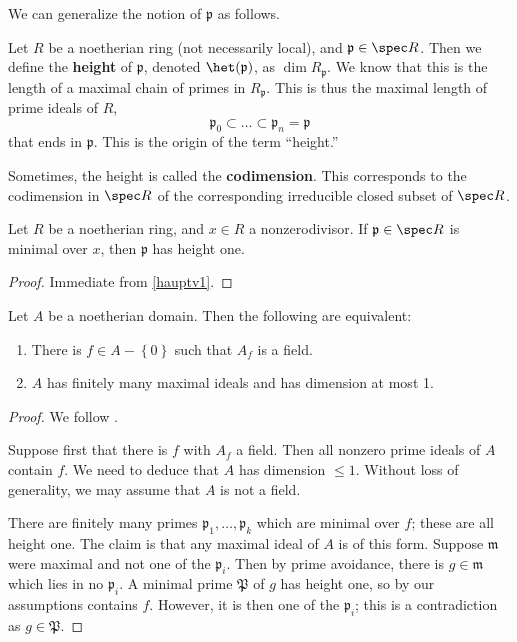 We can generalize the notion of $\mathfrak{p}$ as follows.
\begin{definition} 
Let $R$ be a noetherian ring (not necessarily local), and $\mathfrak{p} \in
\spec R$. Then we define the \textbf{height} of $\mathfrak{p}$, denoted
$\het(\mathfrak{p})$, as $\dim R_{\mathfrak{p}}$.
We know that this is the length of a maximal chain of primes in
$R_{\mathfrak{p}}$. This is thus the maximal length of prime ideals of $R$, 
\[ \mathfrak{p}_0 \subset \dots \subset \mathfrak{p}_n = \mathfrak{p}  \]
that ends in $\mathfrak{p}$. This is the origin of the term ``height.''
\end{definition} 

\begin{remark} 
Sometimes, the height is called the \textbf{codimension}. This corresponds to
the codimension in $\spec R$ of the corresponding irreducible closed subset of
$\spec R$.
\end{remark} 

\begin{theorem}  Let $R$ be a noetherian ring, and $x
\in R$ a nonzerodivisor. If $\mathfrak{p} \in \spec R$ is minimal over $x$,
then $\mathfrak{p}$ has height one.
\end{theorem} 
\begin{proof} 
Immediate from \cref{hauptv1}.
\end{proof} 

\begin{theorem}
Let $A$ be a noetherian domain. Then the following are equivalent:
\begin{enumerate}
\item There is $f \in A-\left\{0\right\} $ such that $A_f$ is a field.
\item $A$ has finitely many maximal ideals and has dimension at most 1.
\end{enumerate}
\end{theorem} 
\begin{proof} We follow \cite{EGA}.

Suppose first that there is $f$ with $A_f$ a field. 
Then all nonzero prime ideals of $A$ contain $f$. 
We need to deduce that $A$ has dimension $\leq 1$. Without loss of generality,
we may assume that $A$ is not a field.

There are finitely many primes $\mathfrak{p}_1,\dots, \mathfrak{p}_k$ which
are minimal over $f$; these are all height one. The claim is that any maximal ideal of $A$ is of this
form. Suppose $\mathfrak{m}$ were maximal and not one of the $\mathfrak{p}_i$.
Then by prime avoidance, there is $g \in \mathfrak{m}$ which
lies in no $\mathfrak{p}_i$. A minimal prime $\mathfrak{P}$ of $g$ has height
one, so by our assumptions contains $f$. However, it is then one of the
$\mathfrak{p}_i$; this is a contradiction as $g \in \mathfrak{P}$.
\end{proof} 


